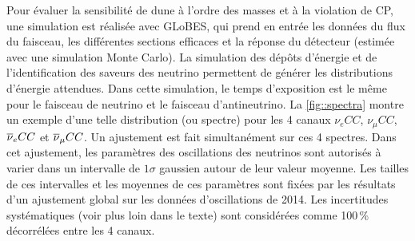         Pour évaluer la sensibilité de \gls{dune} à l'ordre des masses et à la violation de CP, une simulation est réalisée avec GLoBES\cite{ref_needed}, qui prend en entrée les données du flux du faisceau, les différentes sections efficaces et la réponse du détecteur (estimée avec une simulation Monte Carlo). La simulation des dépôts d'énergie et de l'identification des saveurs des neutrino permettent de générer les distributions d'énergie attendues. Dans cette simulation, le temps d'exposition est le même pour le faisceau de neutrino et le faisceau d'antineutrino. La \autoref{fig::spectra} montre un exemple d'une telle distribution (ou spectre) pour les 4 canaux $\nu_e CC$, $\nu_{\mu} CC$, $\overline{\nu}_e CC$ et $\overline{\nu}_{\mu} CC$. Un ajustement est fait simultanément sur ces 4 spectres. Dans cet ajustement, les paramètres des oscillations des neutrinos sont autorisés à varier dans un intervalle de $1\sigma$ gaussien autour de leur valeur moyenne. Les tailles de ces intervalles et les moyennes de ces paramètres sont fixées par les résultats d'un ajustement global sur les données d'oscillations de 2014\cite{ref_needed}. Les incertitudes systématiques (voir plus loin dans le texte) sont considérées comme 100\,\% décorrélées entre les 4 canaux.

